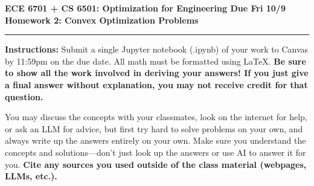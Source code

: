 \documentclass[11pt]{article}
\begin{document}
\thispagestyle{empty}
{\large{\bf ECE 6701 + CS 6501: Optimization for Engineering \hfill Due Fri 10/9}}\\

{\LARGE{\bf Homework 2: Convex Optimization Problems}}
\vspace{0.2\baselineskip}
\hrule

{\bf Instructions:} Submit a single Jupyter notebook (.ipynb) of your work to
Canvas by 11:59pm on the due date. All math must be formatted using LaTeX. {\bf Be sure to show all the work involved in deriving your answers! If you just give
  a final answer without explanation, you may not receive credit for that
  question.}

You may discuss the concepts with your classmates, look on the internet for
help, or ask an LLM for advice, but first try hard to solve problems on your
own, and always write up the answers entirely on your own. Make sure you
understand the concepts and solutions---don't just look up the answers or use AI
to answer it for you. {\bf Cite any sources you used outside of the class
  material (webpages, LLMs, etc.).}
\end{document}
